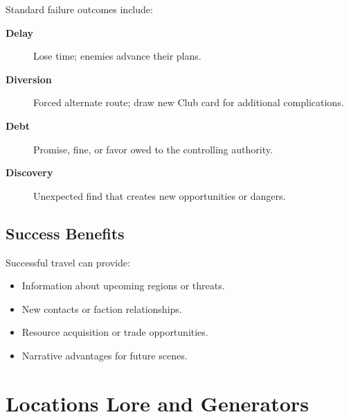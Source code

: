 Standard failure outcomes include:
\begin{description}
\item[\textbf{Delay}] Lose time; enemies advance their plans.
\item[\textbf{Diversion}] Forced alternate route; draw new Club card for additional complications.
\item[\textbf{Debt}] Promise, fine, or favor owed to the controlling authority.
\item[\textbf{Discovery}] Unexpected find that creates new opportunities or dangers.
\end{description}

\subsection{Success Benefits}
\label{subsec:success-benefits}

Successful travel can provide:
\begin{itemize}
\item Information about upcoming regions or threats.
\item New contacts or faction relationships.
\item Resource acquisition or trade opportunities.
\item Narrative advantages for future scenes.
\end{itemize}

\clearpage
\section{Locations Lore and Generators}


\clearpage

\clearpage

\clearpage

\clearpage

\clearpage

\clearpage

\clearpage

\clearpage

\clearpage

\clearpage

\clearpage

\clearpage

\clearpage

\clearpage

\clearpage

\clearpage

\clearpage

\clearpage

\clearpage

\clearpage

\clearpage

\clearpage

\clearpage
